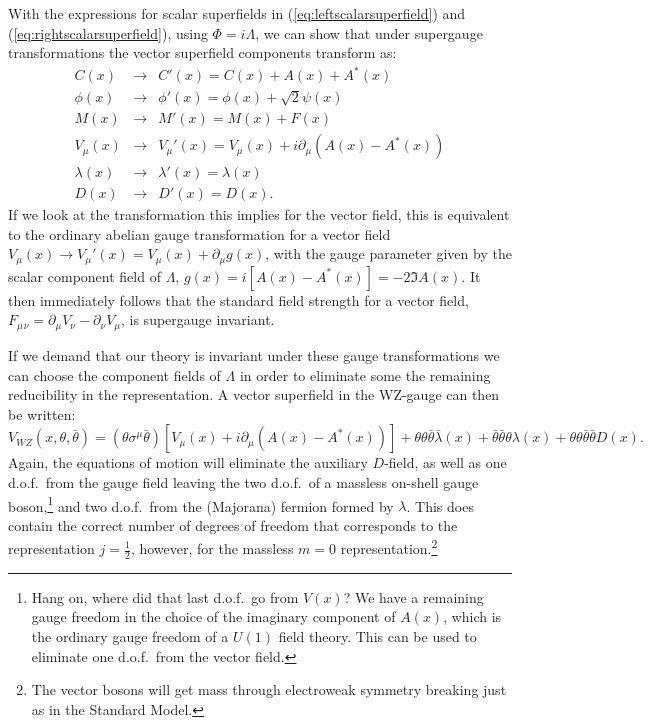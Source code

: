 \documentclass[notes.tex]{subfiles}
\begin{document}
With the expressions for scalar superfields in (\ref{eq:leftscalarsuperfield}) and (\ref{eq:rightscalarsuperfield}), using $\Phi=i\Lambda$, we can show that under supergauge transformations the vector superfield components transform as:
\begin{eqnarray}
C(x) &\to& C'(x) = C(x) + A(x) + A^*(x)\\
\phi(x) &\to& \phi'(x) = \phi(x) + \sqrt{2}\psi(x)\\
M(x) &\to& M'(x) = M(x) + F(x)\\
V_\mu(x) &\to& V_\mu'(x) = V_\mu(x) +i\partial_\mu(A(x) - A^*(x))\\
\lambda(x) &\to& \lambda'(x) = \lambda(x)\\
D(x) &\to& D'(x) = D(x). \label{eq:supergaugetrans_Dterm}
\end{eqnarray}
If we look at the transformation this implies for the vector field, this is equivalent to the ordinary abelian gauge transformation for a vector field  $V_\mu(x)\to V_\mu'(x) = V_\mu(x) +\partial_\mu g(x)$, with the gauge parameter given by the scalar component field of $\Lambda$, $g(x)=i[A(x) - A^*(x)]=-2\Im{A(x)}$. It then immediately follows that the standard field strength for a vector field, $F_\mu{}_\nu = \partial_\mu V_\nu - \partial_\nu V_\mu$, is supergauge invariant. 

If we demand that our theory is invariant under these gauge transformations we can choose the component fields of $\Lambda$ in order to eliminate some the remaining reducibility  in the representation. 
A vector superfield in the WZ-gauge can then be written:
\begin{equation}
V_{WZ} (x, \theta, \bar{\theta}) = (\theta\sigma^\mu \bar{\theta})[V_\mu(x) + i\partial_\mu(A(x) - A^*(x))] + \theta\theta\bar{\theta}\bar{\lambda}(x) + \bar{\theta}\bar{\theta}\theta\lambda (x) + \theta\theta\bar{\theta}\bar{\theta}D(x).
\label{eq:vectorsuperfieldWZ}
\end{equation}
Again, the equations of motion will eliminate the auxiliary $D$-field, as well as one d.o.f.\ from the gauge field leaving the  two d.o.f.\ of a massless on-shell gauge boson,\footnote{Hang on, where did that last d.o.f.\ go from $V(x)$? We have a remaining gauge freedom in the choice of the imaginary component of $A(x)$, which is the ordinary gauge freedom of a $U(1)$ field theory. This can be used to eliminate one d.o.f.\ from the vector field.}  and two d.o.f.\ from the (Majorana) fermion formed by $\lambda$. This does contain the correct number of degrees of freedom that corresponds to the representation $j=\frac{1}{2}$, however, for the massless $m=0$ representation.\footnote{The vector bosons will get mass through electroweak symmetry breaking just as in the Standard Model.}
\end{document}
